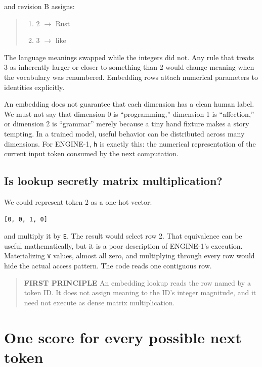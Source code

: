 and revision B assigns:

\begin{quote}
\begin{enumerate}
\item 2  \(\longrightarrow\)  Rust
\item 3  \(\longrightarrow\)  like
\end{enumerate}
\end{quote}

The language meanings swapped while the integers did not. Any rule that
treats 3 as inherently larger or closer to something than 2 would change
meaning when the vocabulary was renumbered. Embedding rows attach
numerical parameters to identities explicitly.

An embedding does not guarantee that each dimension has a clean human
label. We must not say that dimension 0 is ``programming,'' dimension 1
is ``affection,'' or dimension 2 is ``grammar'' merely because a tiny
hand fixture makes a story tempting. In a trained model, useful behavior
can be distributed across many dimensions. For ENGINE-1, \texttt{h} is
exactly this: the numerical representation of the current input token
consumed by the next computation.

\subsection{Is lookup secretly matrix
multiplication?}\label{is-lookup-secretly-matrix-multiplication}

We could represent token 2 as a one-hot vector:

\begin{verbatim}
[0, 0, 1, 0]
\end{verbatim}

and multiply it by \texttt{E}. The result would select row 2. That
equivalence can be useful mathematically, but it is a poor description
of ENGINE-1's execution. Materializing \texttt{V} values, almost all
zero, and multiplying through every row would hide the actual access
pattern. The code reads one contiguous row.

\begin{quote}
\textbf{FIRST PRINCIPLE} An embedding lookup reads the row named by a
token ID. It does not assign meaning to the ID's integer magnitude, and
it need not execute as dense matrix multiplication.
\end{quote}

\section{One score for every possible next
token}\label{one-score-for-every-possible-next-token}

